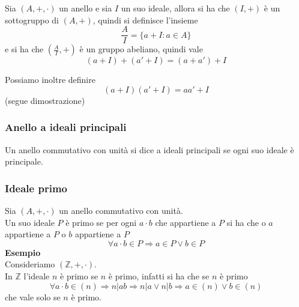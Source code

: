 \begin{flushleft}
\begin{proprieta}
Sia $(A, +, \cdot)$ un anello e sia $I$ un suo ideale, allora si ha che $(I,+)$ è un sottogruppo di $(A,+)$, quindi si definisce l'insieme
\[\frac{A}{I} = \{a+I: a\in A\}\]
e si ha che $(\frac{A}{I}, +)$ è un gruppo abeliano, quindi vale
\[(a + I) + (a' + I) = (a+a') + I\]
\end{proprieta}
Possiamo inoltre definire
\[(a+I)(a'+I) = aa' + I\]
(segue dimostrazione)
\\ \vspace{300px}


\subsubsection{Anello a ideali principali}
Un anello commutativo con unità si dice a ideali principali se ogni suo ideale è principale.

\subsubsection{Ideale primo}
Sia $(A, +, \cdot)$ un anello commutativo con unità.\\
Un suo ideale $P$ è primo se per ogni $a\cdot b$ che appartiene a $P$ si ha che o $a$ appartiene a $P$ o $b$ appartiene a $P$
\[
    \forall a\cdot b \in P\Rightarrow a\in P \vee b\in P
\]
\textbf{Esempio}\\
Consideriamo $(\mathbb{Z}, +, \cdot)$.\\
In $\mathbb{Z}$ l'ideale $n$ è primo se $n$ è primo, infatti si ha che se $n$ è primo
\[\forall a\cdot b\in (n) \Rightarrow n|ab \Rightarrow n|a \vee n|b \Rightarrow a\in (n) \vee b\in (n)\]
che vale solo se $n$ è primo.


\end{flushleft}
